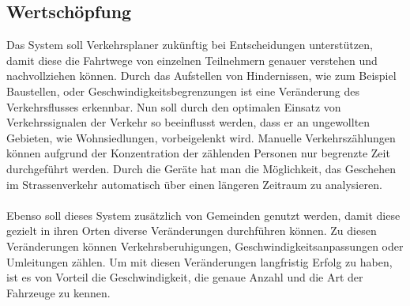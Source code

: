 \subsection{Wertschöpfung}
Das System soll Verkehrsplaner zukünftig bei Entscheidungen unterstützen, damit diese die Fahrtwege von einzelnen Teilnehmern genauer verstehen und nachvollziehen können. Durch das Aufstellen von Hindernissen, wie zum Beispiel Baustellen, oder Geschwindigkeitsbegrenzungen ist eine Veränderung des Verkehrsflusses erkennbar. Nun soll durch den optimalen Einsatz von Verkehrssignalen der Verkehr so beeinflusst werden, dass er an ungewollten Gebieten, wie Wohnsiedlungen, vorbeigelenkt wird. Manuelle Verkehrszählungen können aufgrund der Konzentration der zählenden Personen nur begrenzte Zeit durchgeführt werden. Durch die Geräte hat man die Möglichkeit, das Geschehen im Strassenverkehr automatisch über einen längeren Zeitraum zu analysieren.\\\\
Ebenso soll dieses System zusätzlich von Gemeinden genutzt werden, damit diese gezielt in ihren Orten diverse Veränderungen durchführen können. Zu diesen Veränderungen können Verkehrsberuhigungen, Geschwindigkeitsanpassungen oder Umleitungen zählen. Um mit diesen Veränderungen langfristig Erfolg zu haben, ist es von Vorteil die Geschwindigkeit, die genaue Anzahl und die Art der Fahrzeuge zu kennen.